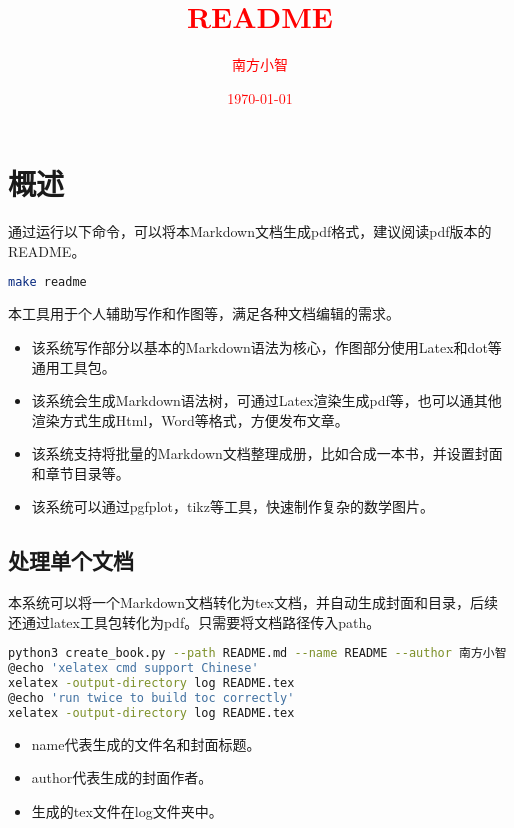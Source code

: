 \documentclass[12pt, letterpaper]{ctexrep}
\title{\fontsize{40}{20} \textbf{\textcolor{red}{\kaishu README}}}
\author{\textcolor{red}{南方小智}}
\date{\textcolor{red}{\today}}
\begin{document}
\maketitle
\thispagestyle{empty}
\newpage

\setcounter{page}{1}
\tableofcontents
\newpage


\chapter{概述}


通过运行以下命令，可以将本Markdown文档生成pdf格式，建议阅读pdf版本的README。

\begin{lstlisting}[language=Bash]
make readme
\end{lstlisting}

本工具用于个人辅助写作和作图等，满足各种文档编辑的需求。


\begin{itemize}
\item{ 该系统写作部分以基本的Markdown语法为核心，作图部分使用Latex和dot等通用工具包。 }
\item{ 该系统会生成Markdown语法树，可通过Latex渲染生成pdf等，也可以通其他渲染方式生成Html，Word等格式，方便发布文章。 }
\item{ 该系统支持将批量的Markdown文档整理成册，比如合成一本书，并设置封面和章节目录等。 }
\item{ 该系统可以通过pgfplot，tikz等工具，快速制作复杂的数学图片。 }
\end{itemize}



\section{处理单个文档}
本系统可以将一个Markdown文档转化为tex文档，并自动生成封面和目录，后续还通过latex工具包转化为pdf。只需要将文档路径传入path。

\begin{lstlisting}[language=Bash]
python3 create_book.py --path README.md --name README --author 南方小智
@echo 'xelatex cmd support Chinese'
xelatex -output-directory log README.tex
@echo 'run twice to build toc correctly'
xelatex -output-directory log README.tex
\end{lstlisting}


\begin{itemize}
\item{ name代表生成的文件名和封面标题。 }
\item{ author代表生成的封面作者。 }
\item{ 生成的tex文件在log文件夹中。 }
\end{itemize}
\end{document}
